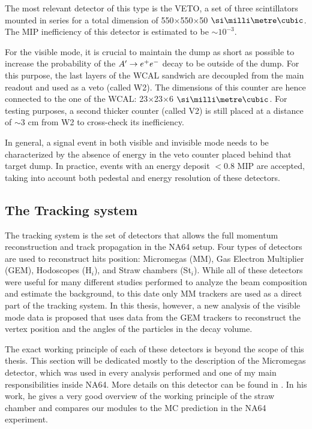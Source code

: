 The most relevant detector of this type is the VETO, a set of three scintillators mounted in series for a total dimension of 550$\times$550$\times$50 $\mmc$. The MIP inefficiency of this detector is estimated to be $\sim 10^{-3}$.

For the visible mode, it is crucial to maintain the dump as short as possible to increase the probability of the $A' \to e^+e^-$ decay to be outside of the dump. For this purpose, the last layers of the WCAL sandwich are decoupled from the main readout and used as a veto (called W2). The dimensions of this counter are hence connected to the one of the WCAL: 23$\times$23$\times$6 $\mmc$. For testing purposes, a second thicker counter (called V2) is still placed at a distance of $\sim3$ \si{cm} from W2 to cross-check its inefficiency.

In general, a signal event in both visible and invisible mode needs to be characterized by the absence of energy in the veto counter placed behind that target dump. In practice, events with an energy deposit $<$0.8 MIP are accepted, taking into account both pedestal and energy resolution of these detectors.

\subsection{The Tracking system}
\label{ch2:sec:detectors-tracking}

The tracking system is the set of detectors that allows the full momentum reconstruction and track propagation in the NA64 setup. Four types of detectors are used to reconstruct hits position: Micromegas (MM), Gas Electron Multiplier (GEM), Hodoscopes (H$_i$), and Straw chambers (St$_i$). While all of these detectors were useful for many different studies performed to analyze the beam composition and estimate the background, to this date only MM trackers are used as a direct part of the tracking system. In this thesis, however, a new analysis of the visible mode data is proposed that uses data from the GEM trackers to reconstruct the vertex position and the angles of the particles in the decay volume.

The exact working principle of each of these detectors is beyond the scope of this thesis. This section will be dedicated mostly to the description of the Micromegas detector, which was used in every analysis performed and one of my main responsibilities inside NA64. More details on this detector can be found in \cite{pdegen-thesis}. In his work, he gives a very good overview of the working principle of the straw chamber and compares our modules to the MC prediction in the NA64 experiment.

